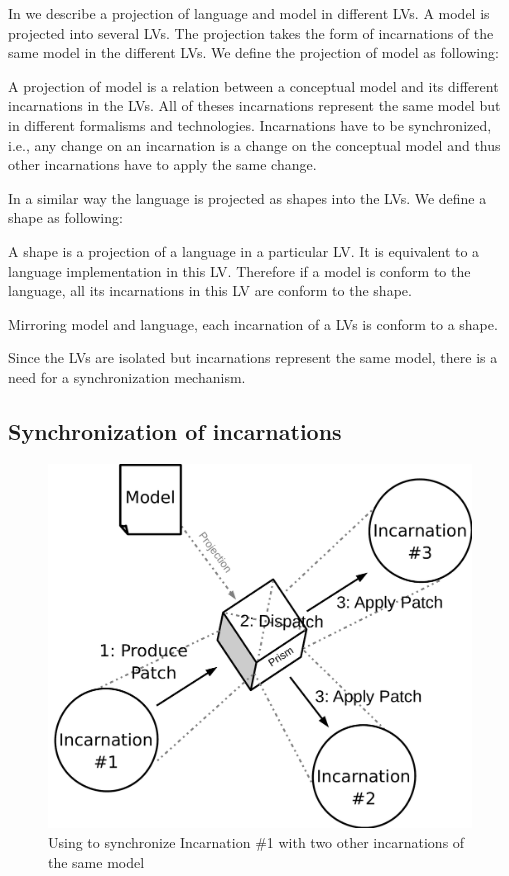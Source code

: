 In  we describe a projection of language and model in different LVs.
A model is projected into several LVs.
The projection takes the form of incarnations of the same model in the different LVs.
We define the projection of model as following:
\begin{definition}
A projection of model is a relation between a conceptual model  and its different incarnations in the LVs.
All of theses incarnations represent the same model but in different formalisms and technologies.
Incarnations have to be synchronized, i.e., any change on an incarnation is a change on the conceptual model and thus other incarnations have to apply the same change.
\end{definition}
In a similar way the language is projected as shapes into the LVs.
We define a shape as following:
\begin{definition}
A shape is a projection of a language in a particular LV.
It is equivalent to a language implementation in this LV.
Therefore if a model is conform to the language, all its incarnations in this LV are conform to the shape.
\end{definition}
Mirroring model and language, each incarnation of a LVs is conform to a shape.

Since the LVs are isolated but incarnations represent the same model, there is a need for a synchronization mechanism.


\subsection{Synchronization of incarnations}

\begin{figure}[bt]
	\centering
	\includegraphics[width=.6\columnwidth]{figures/prism}
	\caption{Using \prism to synchronize Incarnation \#1 with two other incarnations of the same model}
	\label{fig:prism}
\end{figure}

